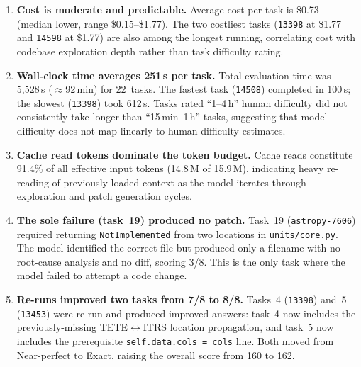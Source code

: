 \begin{enumerate}
\item \textbf{Cost is moderate and predictable.}
      Average cost per task is \$0.73 (median lower, range
      \$0.15--\$1.77).  The two costliest tasks (\texttt{13398} at
      \$1.77 and \texttt{14598} at \$1.77) are also among the longest
      running, correlating cost with codebase exploration depth rather
      than task difficulty rating.

\item \textbf{Wall-clock time averages 251\,s per task.}
      Total evaluation time was 5{,}528\,s (\(\approx\)92\,min) for
      22~tasks.  The fastest task (\texttt{14508}) completed in 100\,s;
      the slowest (\texttt{13398}) took 612\,s.  Tasks rated
      ``1--4\,h'' human difficulty did not consistently take longer
      than ``15\,min--1\,h'' tasks, suggesting that model difficulty
      does not map linearly to human difficulty estimates.

\item \textbf{Cache read tokens dominate the token budget.}
      Cache reads constitute 91.4\% of all effective input tokens
      (14.8\,M of 15.9\,M), indicating heavy re-reading of previously
      loaded context as the model iterates through exploration and
      patch generation cycles.

\item \textbf{The sole failure (task~19) produced no patch.}
      Task~19 (\texttt{astropy-7606}) required returning
      \texttt{NotImplemented} from two locations in
      \texttt{units/core.py}.  The model identified the correct file
      but produced only a filename with no root-cause analysis and no
      diff, scoring 3/8.  This is the only task where the model failed
      to attempt a code change.

\item \textbf{Re-runs improved two tasks from 7/8 to 8/8.}
      Tasks~4 (\texttt{13398}) and~5 (\texttt{13453}) were re-run and
      produced improved answers: task~4 now includes the
      previously-missing TETE$\leftrightarrow$ITRS location
      propagation, and task~5 now includes the prerequisite
      \texttt{self.data.cols = cols} line.  Both moved from
      Near-perfect to Exact, raising the overall score from 160 to 162.

\end{enumerate}
